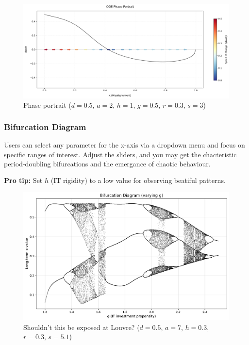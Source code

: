 \documentclass[a4paper, 10pt]{article}
\begin{document}
\begin{figure}[h]
	\centering
	\includegraphics[width=1\textwidth]{../images/results/res-int-2.pdf}
	\caption{Phase portrait ($d = 0.5$, $a = 2$, $h = 1$, $g = 0.5$, $r = 0.3$, $s = 3$)}
	\label{fig:phase_portrait}
\end{figure}

\subsubsection{Bifurcation Diagram}
Users can select any parameter for the x-axis via a dropdown menu and focus on specific ranges of interest.
Adjust the sliders, and you may get the chacteristic period-doubling bifurcations and the emergance of chaotic behaviour.

\textbf{Pro tip:} Set $h$ (IT rigidity) to a low value for observing beatiful patterns.

\begin{figure}[h]
	\centering
	\includegraphics[width=1\textwidth]{../images/results/res-int-3.pdf}
	\caption{Shouldn't this be exposed at Louvre? ($d = 0.5$, $a = 7$, $h = 0.3$, $r = 0.3$, $s = 5.1$)}
	\label{fig:bifurcation}
\end{figure}
\end{document}
